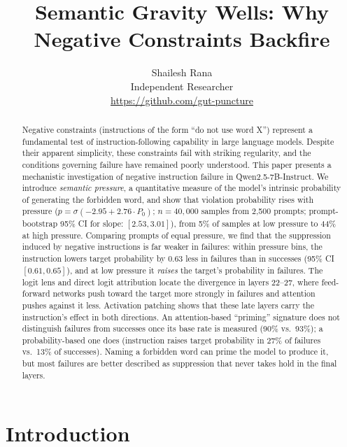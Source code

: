 \documentclass{article}
\title{Semantic Gravity Wells: Why Negative Constraints Backfire}
\author{
  Shailesh Rana\\
  Independent Researcher\\
  \url{https://github.com/gut-puncture}
}
\begin{document}
\raggedbottom
\setlength{\emergencystretch}{1.5em}

\begin{abstract}
Negative constraints (instructions of the form ``do not use word X'') represent a fundamental test of instruction-following capability in large language models. Despite their apparent simplicity, these constraints fail with striking regularity, and the conditions governing failure have remained poorly understood. This paper presents a mechanistic investigation of negative instruction failure in Qwen2.5-7B-Instruct. We introduce \emph{semantic pressure}, a quantitative measure of the model's intrinsic probability of generating the forbidden word, and show that violation probability rises with pressure ($p = \sigma(-2.95 + 2.76 \cdot P_0)$; $n=40{,}000$ samples from 2,500 prompts; prompt-bootstrap 95\% CI for slope: $[2.53, 3.01]$), from 5\% of samples at low pressure to 44\% at high pressure. Comparing prompts of equal pressure, we find that the suppression induced by negative instructions is far weaker in failures: within pressure bins, the instruction lowers target probability by 0.63 less in failures than in successes (95\% CI $[0.61, 0.65]$), and at low pressure it \emph{raises} the target's probability in failures. The logit lens and direct logit attribution locate the divergence in layers 22--27, where feed-forward networks push toward the target more strongly in failures and attention pushes against it less. Activation patching shows that these late layers carry the instruction's effect in both directions. An attention-based ``priming'' signature does not distinguish failures from successes once its base rate is measured (90\% vs.\ 93\%); a probability-based one does (instruction raises target probability in 27\% of failures vs.\ 13\% of successes). Naming a forbidden word can prime the model to produce it, but most failures are better described as suppression that never takes hold in the final layers.
\end{abstract}

\maketitle


\section{Introduction}
\end{document}

